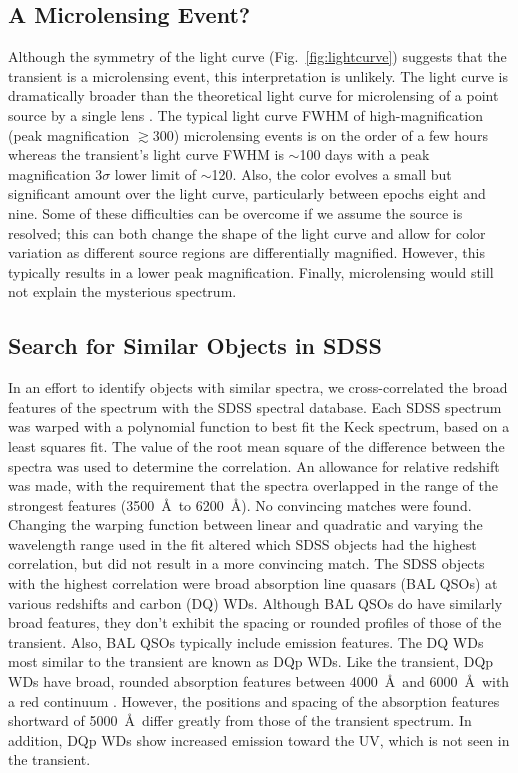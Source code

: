\subsection{A Microlensing Event?}
Although the symmetry of the light curve (Fig.~\ref{fig:lightcurve})
suggests that the transient is a microlensing event, this
interpretation is unlikely.  The light curve is dramatically broader
than the theoretical light curve for microlensing of a point source by
a single lens \citep{paczynski86a}. The typical light curve FWHM of
high-magnification (peak magnification $\gtrsim 300$) microlensing
events is on the order of a few hours \citep[e.g.,][]{abe04a,dong06a}
whereas the transient's light curve FWHM is $\sim$100 days with a peak
magnification $3\sigma$ lower limit of $\sim$120.  Also, the color
evolves a small but significant amount over the light curve,
particularly between epochs eight and nine. Some of these difficulties
can be overcome if we assume the source is resolved; this can both
change the shape of the light curve and allow for color variation as
different source regions are differentially magnified. However, this
typically results in a lower peak magnification. Finally, microlensing
would still not explain the mysterious spectrum.

\subsection{Search for Similar Objects in SDSS}
In an effort to identify objects with similar spectra, we
cross-correlated the broad features of the spectrum with the SDSS
spectral database. Each SDSS spectrum was warped with a polynomial
function to best fit the Keck spectrum, based on a least squares
fit. The value of the root mean square of the difference between the
spectra was used to determine the correlation. An allowance for
relative redshift was made, with the requirement that the spectra
overlapped in the range of the strongest features (3500~\AA\ to
6200~\AA). No convincing matches were found. Changing the warping
function between linear and quadratic and varying the wavelength range
used in the fit altered which SDSS objects had the highest
correlation, but did not result in a more convincing match. The SDSS
objects with the highest correlation were broad absorption line
quasars (BAL QSOs) at various redshifts and carbon (DQ) WDs.  Although
BAL QSOs do have similarly broad features, they don't exhibit the
spacing or rounded profiles of those of the transient. Also, BAL QSOs
typically include emission features. The DQ WDs most similar to the
transient are known as DQp WDs. Like the transient, DQp WDs have
broad, rounded absorption features between 4000~\AA\ and
6000~\AA\ with a red continuum \citep[see, e.g.,][]{hall08a}. However,
the positions and spacing of the absorption features shortward of
5000~\AA\ differ greatly from those of the transient spectrum. In
addition, DQp WDs show increased emission toward the UV, which is not
seen in the transient.

